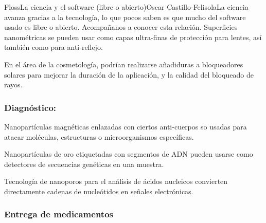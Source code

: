 \begin{article}[2]{Floss}{La ciencia y el software (libre o abierto)}{Oscar Castillo-Felisola}{La ciencia avanza gracias a la tecnolog\'ia, lo que pocos saben es que mucho del software usado es libre o abierto. Acompa\~nanos a conocer esta relaci\'on.}
Superficies nanom\'etricas se pueden usar como capas ultra-finas de protecci\'on para lentes, as\'i tambi\'en como para anti-reflejo.

En el \'area de la cosmetolog\'ia, podr\'ian realizarse a\~nadiduras a bloqueadores solares para mejorar la duraci\'on de la aplicaci\'on, y la calidad del bloqueado de rayos.





\subsubsection*{Diagn\'ostico:}


Nanopart\'iculas magn\'eticas enlazadas con ciertos anti-cuerpos so usadas para atacar mol\'eculas, estructuras o microorganismos  espec\'ificas.

Nanopart\'iculas de oro etiquetadas con segmentos de ADN pueden usarse como detectores de secuencias gen\'eticas en una muestra.

Tecnolog\'ia de nanoporos para el an\'alisis de \'acidos nucleicos convierten directamente cadenas de nucle\'otidos en se\~nales electr\'onicas.






\subsubsection*{Entrega de medicamentos}



\end{article}
